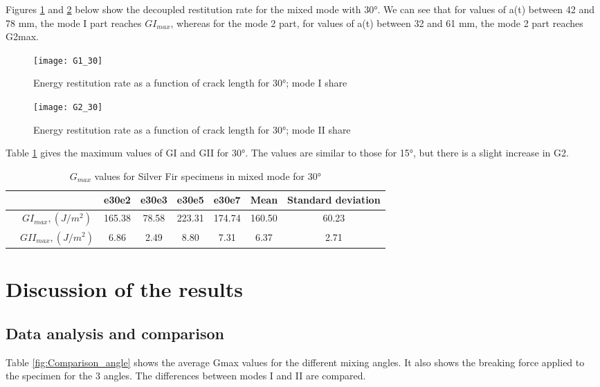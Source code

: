 Figures \ref{fig:G1_30} and \ref{fig:G2_30} below show the decoupled restitution rate for the mixed mode with 30°.
We can see that for values of a(t) between 42 and 78 mm, the mode I part reaches $GI_{max}$, whereas for the mode 2 part, for values of a(t) between 32 and 61 mm, the mode 2 part reaches G2max. 

\begin{figure}[htp]
	\centering
	\texttt{[image: G1\_30]}
	\caption{Energy restitution rate as a function of crack length for 30°; mode I share}
	\label{fig:G1_30}
\end{figure}


\begin{figure}[htp]
	\centering
	\texttt{[image: G2\_30]}
	\caption{Energy restitution rate as a function of crack length for 30°; mode II share}
	\label{fig:G2_30}
\end{figure}

Table \ref{fig:tableG30} gives the maximum values of GI and GII for 30°. The values are similar to those for 15°, but there is a slight increase in G2.

\begin{table} [H]
	\centering
	\begin{tabular}{cccccccc}
		\toprule %
		&  & e30e2 & e30e3 & e30e5 & e30e7 & Mean & Standard deviation\\\midrule
		& $GI_{max}, (J/m^2)$ & 165.38 & 78.58 & 223.31 & 174.74 & 160.50 & 60.23 \\\midrule
		& $GII_{max}, (J/m^2)$ & 6.86 & 2.49 & 8.80 & 7.31 & 6.37 & 2.71\\\midrule
	\end{tabular}
	\caption{$G_{max}$ values for Silver Fir specimens in mixed mode for 30°}
	\label{fig:tableG30}
\end{table}

\section{Discussion of the results}

\subsection{Data analysis and comparison}

Table \ref{fig:Comparison_angle} shows the average Gmax values for the different mixing angles.  It also shows the breaking force applied to the specimen for the 3 angles. The differences between modes I and II are compared.

